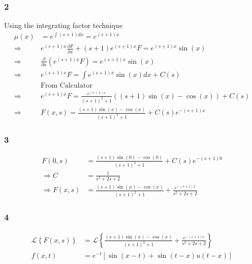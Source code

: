 \documentclass[11pt]{article}
\begin{document}
\subsubsection{2}
\label{sec:org7f79dec}
Using the integrating factor technique
\begin{align*}
\mu(x)&=e^{\int(s+1)dx}=e^{(s+1)x} \\
\Rightarrow &e^{(s + 1)x} \frac{\partial F}{\partial x} + (s + 1)e^{(s + 1)x}F = e^{(s + 1)x}\sin(x)\\
\Rightarrow&\frac{\partial}{\partial x}\left(e^{(s + 1)x}F\right) = e^{(s + 1)x}\sin(x)\\
\Rightarrow & e^{(s + 1)x}F = \int e^{(s + 1)x}\sin(x) dx + C(s) \\
&\textrm{From Calculator}\\
\Rightarrow &e^{(s + 1)x}F = \frac{e^{(s + 1)x}}{(s + 1)^2 + 1}((s + 1)\sin(x) - \cos(x)) + C(s)\\
\Rightarrow & F(x, s) = \frac{(s + 1)\sin(x) - \cos(x)}{(s + 1)^2 + 1} + C(s)e^{-(s + 1)x}
\end{align*}
\subsubsection{3}
\label{sec:org0b21eaa}
\begin{align*}
F(0, s) &= \frac{(s + 1)\sin(0) - \cos(0)}{(s + 1)^2 + 1} + C(s)e^{-(s + 1)0} \\
\Rightarrow C &= \frac{1}{s^2+2s+2} \\
\Rightarrow  F(x, s) &= \frac{(s + 1)\sin(x) - \cos(x)}{(s + 1)^2 + 1} + \frac{e^{-(s + 1)x}}{s^2+2s+2}
\end{align*}
\subsubsection{4}
\label{sec:org8942e19}
\begin{align*}
\mathcal{L}\left\{F(x, s)\right\} &= \mathcal{L}\left\{\frac{(s + 1)\sin(x) - \cos(x)}{(s + 1)^2 + 1} + \frac{e^{-(s + 1)x}}{s^2+2s+2}\right\} \\
f(x,t)&=e^{-t}[\sin(x-t)+\sin(t-x)u(t-x)]
\end{align*}
\end{document}
